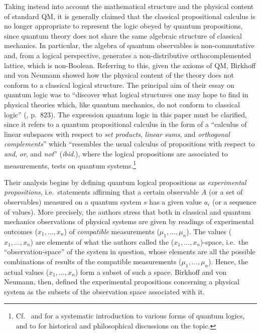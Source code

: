 \documentclass[11pt, executivepaper]{article}
\begin{document}
Taking instead into account the mathematical structure and the physical content of standard QM, it is generally claimed that the classical propositional calculus is no longer appropriate to represent the logic obeyed by quantum propositions, since quantum theory does not share the same algebraic structure of classical mechanics. In particular, the algebra of quantum observables is non-commutative and, from a logical perspective, generates a non-distributive orthocomplemented lattice, which is non-Boolean. 
Referring to this, given the axioms of QM, Birkhoff and von Neumann showed how the physical content of the theory does not conform to a classical logical structure. The principal aim of their essay on quantum logic was to ``discover what logical structures one may hope to find in physical theories which, like quantum mechanics, do not conform to classical logic'' (\cite{vonNeumann:1936}, p.\ 823). The expression quantum logic in this paper must be clarified, since it refers to a quantum propositional calculus in the form of a ``calculus of linear subspaces with respect to \emph{set products}, \emph{linear sums}, and \emph{orthogonal complements}'' which ``resembles the usual calculus of propositions with respect to \emph{and}, \emph{or}, and \emph{not}'' (\emph{ibid}.), where the logical propositions are associated to measurements, tests on quantum systems.\footnote{Cf.\ \cite{Giuntini:2002} and \cite{DallaChiara:2004} for a systematic introduction to various forms of quantum logics, and to \cite{Engesser:2009} for historical and philosophical discussions on the topic.}

Their analysis begins by defining quantum logical propositions as \emph{experimental propositions}, i.e.\ statements affirming that a certain observable $A$ (or a set of observables) measured on a quantum system $s$ has a given value $a_i$ (or a sequence of values). More precisely, the authors stress that both in classical and quantum mechanics observations of physical systems are given by readings of experimental outcomes ($x_1, \dots, x_n$) of \emph{compatible} measurements ($\mu_1, \dots, \mu_n$). The values ($x_1, \dots, x_n$) are elements of what the authors called the ($x_1, \dots, x_n$)-space, i.e.\ the ``observation-space'' of the system in question, whose elements are all the possible combinations of results of the compatible measurements ($\mu_1, \dots, \mu_n$). Hence, the actual values ($x_1, \dots, x_n$) form a subset of such a space. Birkhoff and von Neumann, then, defined the experimental propositions concerning a physical system as the subsets of the observation space associated with it.
\end{document}
